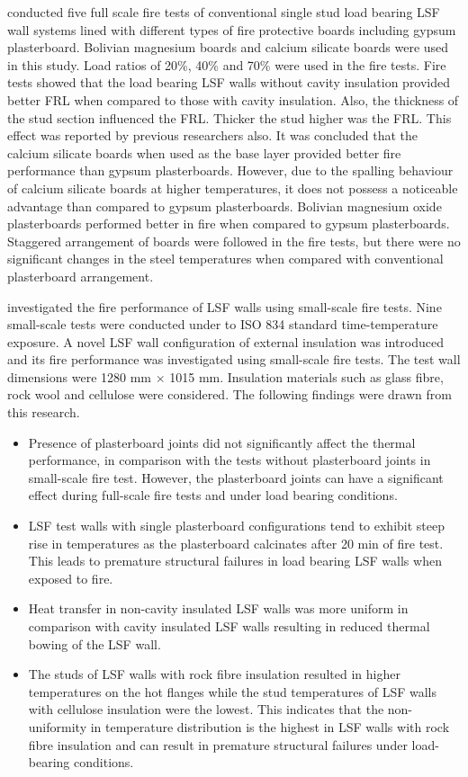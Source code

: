 \citet{Chen2012a} conducted five full scale fire tests of conventional single stud load bearing LSF wall systems lined with different types of fire protective boards including gypsum plasterboard. Bolivian magnesium boards and calcium silicate boards were used in this study. Load ratios of 20\%, 40\% and 70\% were used in the fire tests. Fire tests showed that the load bearing LSF walls without cavity insulation provided better FRL when compared to those with cavity insulation. Also, the thickness of the stud section influenced the FRL. Thicker the stud higher was the FRL. This effect was reported by previous researchers also. It was concluded that the calcium silicate boards when used as the base layer provided better fire performance than gypsum plasterboards. However, due to the spalling behaviour of calcium silicate boards at higher temperatures, it does not possess a noticeable advantage than compared to gypsum plasterboards. Bolivian magnesium oxide plasterboards performed better in fire when compared to gypsum plasterboards. Staggered arrangement of boards were followed in the fire tests, but there were no significant changes in the steel temperatures when compared with conventional plasterboard arrangement. 

\citet{Kolarkar2012} investigated the fire performance of LSF walls using small-scale fire tests. Nine small-scale tests were conducted under to ISO 834 standard time-temperature exposure. A novel LSF wall configuration of external insulation was introduced and its fire performance was investigated using small-scale fire tests. The test wall dimensions were 1280 mm $\times$ 1015 mm. Insulation materials such as glass fibre, rock wool and cellulose were considered. The following findings were drawn from this research.
\begin{itemize}
	\item Presence of plasterboard joints did not significantly affect the thermal performance, in comparison with the tests without plasterboard joints in small-scale fire test. However, the plasterboard joints can have a significant effect during full-scale fire tests and under load bearing conditions.
	\item LSF test walls with single plasterboard configurations tend to exhibit steep rise in temperatures as the plasterboard calcinates after 20 min of fire test. This leads to premature structural failures in load bearing LSF walls when exposed to fire.
	\item Heat transfer in non-cavity insulated LSF walls was more uniform in comparison with cavity insulated LSF walls resulting in reduced thermal bowing of the LSF wall.
	\item The studs of LSF walls with rock fibre insulation resulted in higher temperatures on the hot flanges while the stud temperatures of LSF walls with cellulose insulation were the lowest. This indicates that the non-uniformity in temperature distribution is the highest in LSF walls with rock fibre insulation and can result in premature structural failures under load-bearing conditions.
\end{itemize}

